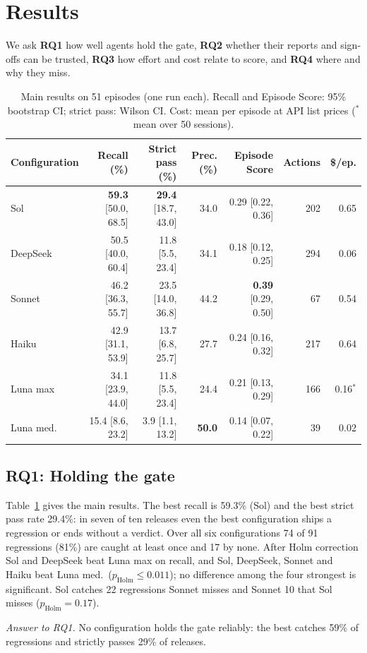 \documentclass[10pt,letterpaper]{article}
\newcommand{\answer}[2]{\par\noindent\textit{Answer to RQ#1.} #2}
\begin{document}
\section{Results}
We ask \textbf{RQ1} how well agents hold the gate, \textbf{RQ2} whether their reports and sign-offs can be
trusted, \textbf{RQ3} how effort and cost relate to score, and \textbf{RQ4} where and why they miss.

\begin{table}[t]
  \centering
  \caption{Main results on 51 episodes (one run each). Recall and Episode Score: 95\% bootstrap CI;
  strict pass: Wilson CI. Cost: mean per episode at API list prices ($^\ast$mean over 50 sessions).}
  \label{tab:main}
  \small\setlength{\tabcolsep}{4pt}
  \begin{tabular}{@{}lrrrrrr@{}}
    \toprule
    Configuration & Recall (\%) & Strict pass (\%) & Prec. (\%) & Episode Score & Actions & \$/ep. \\
    \midrule
    Sol & \textbf{59.3} [50.0, 68.5] & \textbf{29.4} [18.7, 43.0] & 34.0 & 0.29 [0.22, 0.36] & 202 & 0.65 \\
    DeepSeek & 50.5 [40.0, 60.4] & 11.8 [5.5, 23.4] & 34.1 & 0.18 [0.12, 0.25] & 294 & 0.06 \\
    Sonnet & 46.2 [36.3, 55.7] & 23.5 [14.0, 36.8] & 44.2 & \textbf{0.39} [0.29, 0.50] & 67 & 0.54 \\
    Haiku & 42.9 [31.1, 53.9] & 13.7 [6.8, 25.7] & 27.7 & 0.24 [0.16, 0.32] & 217 & 0.64 \\
    Luna max & 34.1 [23.9, 44.0] & 11.8 [5.5, 23.4] & 24.4 & 0.21 [0.13, 0.29] & 166 & 0.16$^\ast$ \\
    Luna med. & 15.4 [8.6, 23.2] & 3.9 [1.1, 13.2] & \textbf{50.0} & 0.14 [0.07, 0.22] & 39 & 0.02 \\
    \bottomrule
  \end{tabular}
\end{table}

\subsection{RQ1: Holding the gate}
Table~\ref{tab:main} gives the main results. The best recall is 59.3\% (Sol) and the best strict pass
rate 29.4\%: in seven of ten releases even the best configuration ships a regression or ends
without a verdict. Over all six configurations 74 of 91 regressions (81\%) are caught at least once and
17 by none. After Holm correction Sol and DeepSeek beat Luna max on recall, and Sol, DeepSeek, Sonnet
and Haiku beat Luna med.\ ($p_{\text{Holm}}\le0.011$); no difference among the four strongest is
significant. Sol catches 22 regressions Sonnet misses and Sonnet 10 that Sol misses
($p_{\text{Holm}}=0.17$).
\answer{1}{No configuration holds the gate reliably: the best catches 59\% of regressions and strictly
passes 29\% of releases.}
\end{document}
